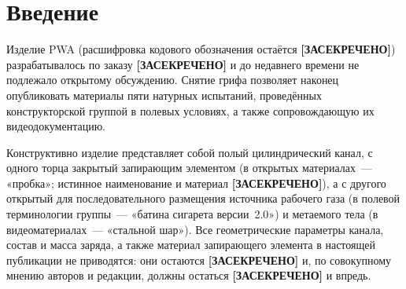 \documentclass[11pt,a4paper]{article}
\newcommand{\SEC}{\textbf{[ЗАСЕКРЕЧЕНО]}}
\begin{document}
\begin{abstract}
\noindent Здесь мы впервые показываем, что метательное изделие, собранное из \SEC{} и запираемое элементом типа~«пробка», представляет собой не хаотическое устройство, а строгую реализацию адиабатического расширения газа в цилиндре, выходящего на жёсткий предел скорости, и что все его наблюдаемые отказы лежат на одной аналитической кривой. Проблема состояла в том, что изделие PWA, разработанное по заказу \SEC{} и рассекреченное лишь в текущем году, до сих пор описывалось исключительно на языке восклицаний. Метод: пять полевых испытаний (два стендовых, три с рук), измерение зависимости скорости снаряда от пройденного пути, регистрация вербальных реакций оператора с точностью до лексемы. Результаты: получена аналитическая форма $v(x)$; доказано существование оптимума запирания; доказана невозвратность снаряда; установлена логарифмическая связь между бронепробитием и ненормативной лексикой. Ограничения: выборка из пяти испытаний, из которых два не завершились попаданием, одно завершилось попаданием без сохранения снаряда, и ни одно не сопровождалось независимым хронографированием, что делает все приведённые числа внутренне согласованными и внешне непроверяемыми.

\medskip
\noindent\textbf{Ключевые слова:} внутренняя баллистика, адиабатическое расширение, запирающий элемент, теория поиска, принцип баллистической неопределённости, лексическая термометрия, лженаука
\end{abstract}

\section{Введение}

Изделие PWA (расшифровка кодового обозначения остаётся \SEC) разрабатывалось по заказу \SEC{} и до недавнего времени не подлежало открытому обсуждению. Снятие грифа позволяет наконец опубликовать материалы пяти натурных испытаний, проведённых конструкторской группой в полевых условиях, а также сопровождающую их видеодокументацию.

Конструктивно изделие представляет собой полый цилиндрический канал, с одного торца закрытый запирающим элементом (в открытых материалах~--- «пробка»; истинное наименование и материал \SEC), а с другого открытый для последовательного размещения источника рабочего газа (в полевой терминологии группы~--- «батина сигарета версии~2.0») и метаемого тела (в видеоматериалах~--- «стальной шар»). Все геометрические параметры канала, состав и масса заряда, а также материал запирающего элемента в настоящей публикации не приводятся: они остаются \SEC{} и, по совокупному мнению авторов и редакции, должны остаться \SEC{} и впредь.
\end{document}
